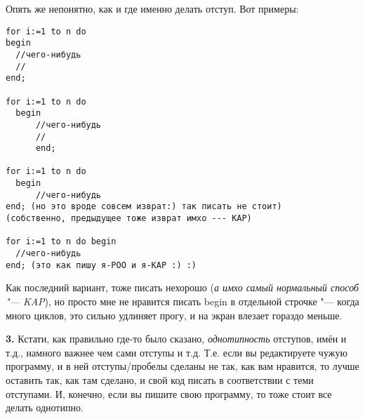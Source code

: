   Опять же непонятно, как и где именно делать отступ. Вот примеры:
  
\begin{codesample}\begin{verbatim}
for i:=1 to n do 
begin
  //чего-нибудь
  //
end;

for i:=1 to n do 
  begin
      //чего-нибудь
      //
      end;

for i:=1 to n do 
  begin
      //чего-нибудь
end; (но это вроде совсем изврат:) так писать не стоит)
(собственно, предыдущее тоже изврат имхо --- KAP)

for i:=1 to n do begin
  //чего-нибудь
end; (это как пишу я-POO и я-KAP :) :)
\end{verbatim}
\end{codesample}

Как последний вариант, тоже писать нехорошо (\textsl{а имхо самый нормальный способ "--- KAP}), но просто мне 
не нравится писать begin в отдельной строчке "--- когда много циклов, это сильно удлиняет прогу, и 
на экран влезает гораздо меньше.

\textbf{3.} Кстати, как правильно где-то было сказано, \textit{однотипность} отступов, имён и т.д., намного важнее чем сами отступы и т.д. Т.е. если вы редактируете чужую программу, и в ней отступы/пробелы сделаны не так, как вам нравится, то лучше оставить так, как там сделано, и свой код писать в соответствии с теми отступами. И, конечно, если вы пишите свою программу, то тоже стоит все делать однотипно.
